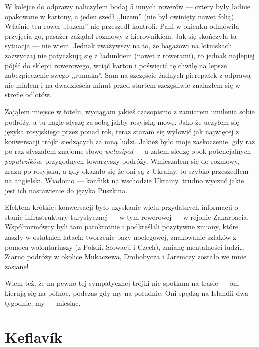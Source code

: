 
W kolejce do odprawy naliczyłem bodaj 5 innych rowerów --- cztery były ładnie opakowane w kartony, a jeden szedł ,,luzem'' (nie był owinięty nawet folią). Właśnie ten rower ,,luzem'' nie przeszedł kontroli. Pani w okienku odmówiła przyjęcia go, pasażer zażądał rozmowy z kierownikiem. Jak się skończyła ta sytuacja --- nie wiem. Jednak zważywszy na to, że bagażowi na lotniskach zazwyczaj nie patyczkują się z ładunkiem (nawet z rowerami), to jednak najlepiej pójść do sklepu rowerowego, wciąć karton i poświęcić tę chwilę na lepsze zabezpieczenie swego ,,rumaka''. Sam na szczęście żadnych pierepałek z odprawą nie miałem i na dwadzieścia minut przed startem szczęśliwie znalazłem się w strefie odlotów.

Zająłem miejsce w fotelu, wyciągam jakieś czasopismo z zamiarem umilenia sobie podróży, a tu nagle słyszę za sobą jakby rosyjską mowę. Jako że uczyłem się języka rosyjskiego przez ponad rok, teraz staram się wyłowić jak najwięcej z konwersacji trójki siedzących za mną ludzi. Jakież było moje zaskoczenie, gdy raz po raz słyszałem znajome słowo \emph{wełosiped} --- a zatem siedzę obok potencjalnych \emph{poputczików}, przygodnych towarzyszy podróży. Wmieszałem się do rozmowy, zrazu po rosyjsku, a gdy okazało się że oni są z Ukrainy, to szybko przeszedłem na angielski. Wiadomo --- konflikt na wschodzie Ukrainy, trudno wyczuć jakie jest ich nastawienie do języka Puszkina.

Efektem krótkiej konwersacji było uzyskanie wielu przydatnych informacji o stanie infrastruktury turystycznej --- w tym rowerowej --- w rejonie Zakarpacia. Współrozmówcy byli tam parokrotnie i podkreślali pozytywne zmiany, które zaszły w ostatnich latach: tworzenie bazy noclegowej, znakowanie szlaków z pomocą wolontariuszy (z Polski, Słowacji i Czech), zmianę mentalności ludzi…  Ziarno podróży w okolice Mukaczewa, Drohobycza i Jaremczy zostało we mnie zasiane!

Wiem też, że na pewno tej sympatycznej trójki nie spotkam na trasie --- oni kierują się na północ, podczas gdy my na południe. Oni spędzą na Islandii dwa tygodnie, my --- miesiąc.

\section*{Keflavík}

